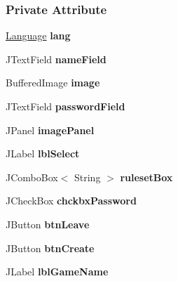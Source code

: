 \subsubsection*{Private Attribute}
\begin{DoxyCompactItemize}
\item 
\hypertarget{a00008_a430764470b3602491655161cdd67ee8c}{\hyperlink{a00015}{Language} {\bfseries lang}}\label{a00008_a430764470b3602491655161cdd67ee8c}

\item 
\hypertarget{a00008_a2b4470f7f3f7456c7e52d1604438a878}{J\-Text\-Field {\bfseries name\-Field}}\label{a00008_a2b4470f7f3f7456c7e52d1604438a878}

\item 
\hypertarget{a00008_a45e94f786577439d02e4f16aefa96717}{Buffered\-Image {\bfseries image}}\label{a00008_a45e94f786577439d02e4f16aefa96717}

\item 
\hypertarget{a00008_ab86817c3677c2dc422445fe8c0b5a404}{J\-Text\-Field {\bfseries password\-Field}}\label{a00008_ab86817c3677c2dc422445fe8c0b5a404}

\item 
\hypertarget{a00008_a8f4aaa528d2092952844a99aa948932f}{J\-Panel {\bfseries image\-Panel}}\label{a00008_a8f4aaa528d2092952844a99aa948932f}

\item 
\hypertarget{a00008_ac3a56e854d86f838fbfe3bad5fca49ea}{J\-Label {\bfseries lbl\-Select}}\label{a00008_ac3a56e854d86f838fbfe3bad5fca49ea}

\item 
\hypertarget{a00008_a7916a564649b0412714b6ea8c2251812}{J\-Combo\-Box$<$ String $>$ {\bfseries ruleset\-Box}}\label{a00008_a7916a564649b0412714b6ea8c2251812}

\item 
\hypertarget{a00008_a5df88a40b8ff9b13b83ca12563ba89c7}{J\-Check\-Box {\bfseries chckbx\-Password}}\label{a00008_a5df88a40b8ff9b13b83ca12563ba89c7}

\item 
\hypertarget{a00008_a1887f14b78aa91b00e5ce42aa504dbe2}{J\-Button {\bfseries btn\-Leave}}\label{a00008_a1887f14b78aa91b00e5ce42aa504dbe2}

\item 
\hypertarget{a00008_a69446706c0a5c7165a4de4f64d7b2261}{J\-Button {\bfseries btn\-Create}}\label{a00008_a69446706c0a5c7165a4de4f64d7b2261}

\item 
\hypertarget{a00008_a59c71155f1fd33a521bce1afebc0863b}{J\-Label {\bfseries lbl\-Game\-Name}}\label{a00008_a59c71155f1fd33a521bce1afebc0863b}

\end{DoxyCompactItemize}
